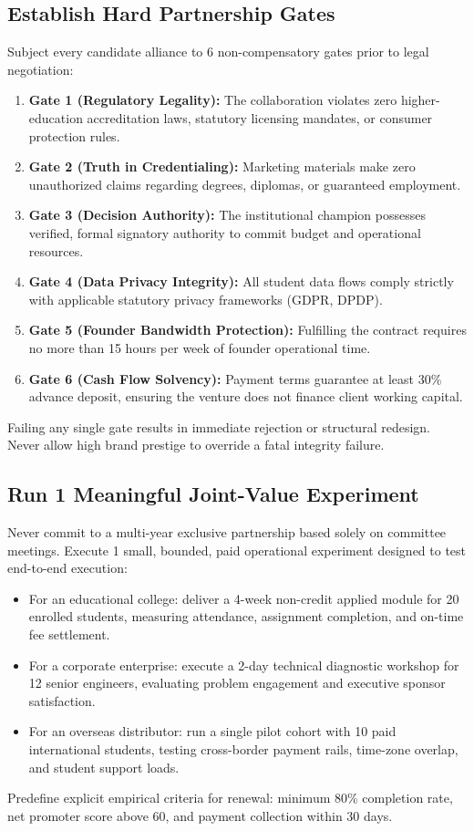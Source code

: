 \subsection{Establish Hard Partnership Gates}
\label{sec:establish_hard_partnership_gates}

Subject every candidate alliance to 6 non-compensatory gates prior to legal negotiation:
\begin{enumerate}
\item \textbf{Gate 1 (Regulatory Legality):} The collaboration violates zero higher-education accreditation laws, statutory licensing mandates, or consumer protection rules.
\item \textbf{Gate 2 (Truth in Credentialing):} Marketing materials make zero unauthorized claims regarding degrees, diplomas, or guaranteed employment.
\item \textbf{Gate 3 (Decision Authority):} The institutional champion possesses verified, formal signatory authority to commit budget and operational resources.
\item \textbf{Gate 4 (Data Privacy Integrity):} All student data flows comply strictly with applicable statutory privacy frameworks (GDPR, DPDP).
\item \textbf{Gate 5 (Founder Bandwidth Protection):} Fulfilling the contract requires no more than 15 hours per week of founder operational time.
\item \textbf{Gate 6 (Cash Flow Solvency):} Payment terms guarantee at least 30\% advance deposit, ensuring the venture does not finance client working capital.
\end{enumerate}
Failing any single gate results in immediate rejection or structural redesign. Never allow high brand prestige to override a fatal integrity failure.

\subsection{Run 1 Meaningful Joint-Value Experiment}
\label{sec:run_single_joint_value_experiment}

Never commit to a multi-year exclusive partnership based solely on committee meetings. Execute 1 small, bounded, paid operational experiment designed to test end-to-end execution:
\begin{itemize}
\item For an educational college: deliver a 4-week non-credit applied module for 20 enrolled students, measuring attendance, assignment completion, and on-time fee settlement.
\item For a corporate enterprise: execute a 2-day technical diagnostic workshop for 12 senior engineers, evaluating problem engagement and executive sponsor satisfaction.
\item For an overseas distributor: run a single pilot cohort with 10 paid international students, testing cross-border payment rails, time-zone overlap, and student support loads.
\end{itemize}
Predefine explicit empirical criteria for renewal: minimum 80\% completion rate, net promoter score above 60, and payment collection within 30 days.

